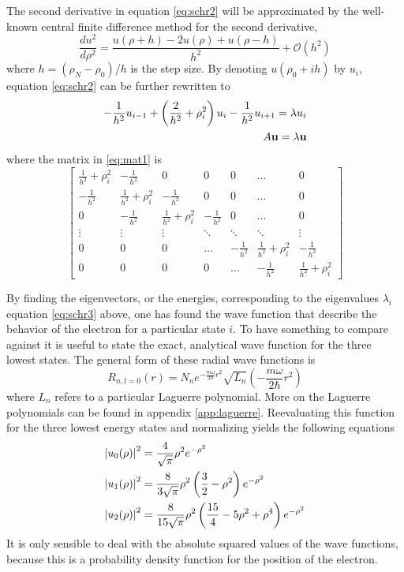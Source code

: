 \documentclass[10pt, a4paper]{amsart}
\begin{document}
The second derivative in equation \ref{eq:schr2} will be approximated by the well-known central finite difference method for the second derivative,
\begin{equation}
\frac{du^2}{d\rho^2}=\frac{u(\rho+h)-2u(\rho)+u(\rho-h)}{h^2}+\mathcal{O}(h^2)
\end{equation}
where $h = (\rho_N-\rho_0)/h$ is the step size. By denoting $u(\rho_0+ih)$ by $u_i$, equation \ref{eq:schr2} can be further rewritten to
\begin{align}
-\frac{1}{h^2}u_{i-1}+\left(\frac{2}{h^2} + \rho_i^2 \right)u_i-\frac{1}{h^2}u_{i+1}=\lambda u_i \label{eq:schr3}\\
A\vb{u} = \lambda \vb{u} \label{eq:mat1}
\end{align} 
where the matrix in \ref{eq:mat1} is
\begin{equation}
\begin{bmatrix}
\frac{1}{h^2} + \rho_i^2 & -\frac{1}{h^2} & 0 & 0 & 0 & \dots & 0 \\
-\frac{1}{h^2} & \frac{1}{h^2} + \rho_i^2 & -\frac{1}{h^2} & 0 & 0 & \dots & 0 \\
0 & -\frac{1}{h^2} & \frac{1}{h^2} + \rho_i^2 & -\frac{1}{h^2} & 0 & \dots & 0  \\
\vdots & \vdots & \vdots &\ddots & \ddots & \ddots & \vdots \\
0 & 0 & 0 & \dots &  -\frac{1}{h^2} & \frac{1}{h^2} + \rho_i^2 & -\frac{1}{h^2} \\
0 & 0 & 0 & 0 & \dots & -\frac{1}{h^2} & \frac{1}{h^2} + \rho_i^2 
\end{bmatrix}
\end{equation}

By finding the eigenvectors, or the energies, corresponding to the eigenvalues $\lambda_i$  equation \ref{eq:schr3} above, one has found the wave function that describe the behavior of the electron for a particular state $i$. To have something to compare against it is useful to state the exact, analytical wave function for the three lowest states. The general form of these radial wave functions is 
\begin{equation}
\label{eq:radialschr1}
R_{n,l=0}(r)=N_ne^{-\frac{m\omega}{2\hbar}r^2}\sqrt{L_n}\left(-\frac{m\omega}{2\hbar} r^2 \right)
\end{equation}
where $L_n$ refers to a particular Laguerre polynomial. More on the Laguerre polynomials can be found in appendix \ref{app:laguerre}. Reevaluating this function for the three lowest energy states and normalizing yields the following equations
\begin{align}
\abs{u_0(\rho)}^2 &= \frac{4}{\sqrt{\pi}}\rho^2e^{-\rho^2} \\
\abs{u_1(\rho)}^2 &= \frac{8}{3\sqrt{\pi}}\rho^2\left( \frac{3}{2}-\rho^2 \right)e^{-\rho^2} \\
\abs{u_2(\rho)}^2 &= \frac{8}{15\sqrt{\pi}}\rho^2\left( \frac{15}{4}-5\rho^2 +\rho^4\right)e^{-\rho^2}
\end{align}
It is only sensible to deal with the absolute squared values of the wave functions, because this is a probability density function for the position of the electron.
\end{document}
